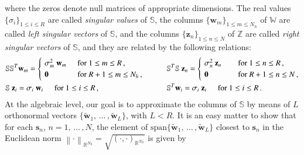 \documentclass[longtitle]{elsarticle}
\numberwithin{equation}{section}
\theoremstyle{theorem}
\theoremstyle{definition}
\theoremstyle{remark}
\theoremstyle{proposition}
\numberwithin{figure}{section}
\newcommand{\norm}[1]{\left\lVert#1\right\rVert}
\newcommand{\wt}[1]{\widetilde{#1}}
\begin{document}
		where the zeros denote null matrices of appropriate dimensions. The real values $\big\lbrace \sigma_i \big\rbrace_{1 \leq i \leq R}$ are called \emph{singular values} of $\mathbb{S}$, the columns $\big\lbrace \mathbf{w}_m \big\rbrace_{1 \leq m \leq N_h}$ of $\mathbb{W}$ are called \emph{left singular vectors} of $\mathbb{S}$, and the columns $\big\lbrace \mathbf{z}_n \big\rbrace_{1 \leq n \leq N}$ of $\mathbb{Z}$ are called \emph{right singular vectors} of $\mathbb{S}$, and they are related by the following relations:
		\begin{equation}
			\label{eq:svd-relationships}
			\begin{aligned}
				& \mathbb{S} \mathbb{S}^T \mathbf{w}_m = 
				\begin{cases}
					& \hspace*{-0.3cm} \sigma_m^2 ~ \mathbf{w}_m \hspace*{0.5cm} \text{for $1 \leq m \leq R$} \, , \\
					& \hspace*{-0.3cm} \mathrlap{\mathbf{0}}\hphantom{\sigma_m^2 ~ \mathbf{w}_m} \hspace*{0.5cm} \text{for $R+1 \leq m \leq {N_h}$} \, ,
				\end{cases}
				\qquad
				&& \mathbb{S}^T \mathbb{S} ~ \mathbf{z}_n =
				\begin{cases}
					& \hspace*{-0.3cm} \sigma_n^2 ~ \mathbf{z}_n \hspace*{0.74cm} \text{for $1 \leq n \leq R$} \, , \\
					& \hspace*{-0.3cm} \mathrlap{\mathbf{0}}\hphantom{\sigma_n^2 ~ \mathbf{z}_n} \hspace*{0.74cm} \text{for $R+1 \leq n \leq N$} \, ,
				\end{cases} \\
				& \mathbb{S} ~ \mathbf{z}_i = \sigma_i ~ \mathbf{w}_i \hspace*{0.5cm} \text{for $1 \leq i \leq R$} \, , 
				&& \mathbb{S}^T \mathbf{w}_i = \sigma_i ~ \mathbf{z}_i \hspace*{0.5cm} \text{for $1 \leq i \leq R$} \, .
			\end{aligned}
		\end{equation}
		At the algebraic level, our goal is to approximate the columns of $\mathbb{S}$ by means of $L$ orthonormal vectors $\big\lbrace \wt{\mathbf{w}}_1, \, \ldots \, , \wt{\mathbf{w}}_L \big\rbrace$, with $L < R$. It is an easy matter to show that for each $\mathbf{s}_n$, $n = 1, \, \ldots \, , N$, the element of $\text{span} \big\lbrace \wt{\mathbf{w}}_1, \, \ldots \, , \wt{\mathbf{w}}_L \big\rbrace$ closest to $\mathbf{s}_n$ in the Euclidean norm $\norm{\cdot}_{\mathbb{R}^{N_h}} = \sqrt{(\cdot,\cdot)_{\mathbb{R}^{N_h}}}$ is given by
\end{document}
